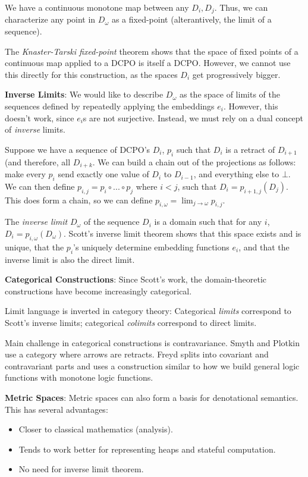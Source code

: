 \documentclass{article}
\begin{document}
We have a continuous monotone map between any $D_i, D_j$.  Thus, we
can characterize any point in $D_{\omega}$ as a fixed-point
(alterantively, the limit of a sequence).

The \emph{Knaster-Tarski fixed-point} theorem shows that the space of
fixed points of a continuous map applied to a DCPO is itself a DCPO.
However, we cannot use this directly for this construction, as the
spaces $D_i$ get progressively bigger.

\textbf{Inverse Limits}: We would like to describe $D_{\omega}$ as the
space of limits of the sequences defined by repeatedly applying the
embeddings $e_i$.  However, this doesn't work, since $e_i$s are not
surjective.  Instead, we must rely on a dual concept of \emph{inverse}
limits.

Suppose we have a sequence of DCPO's $D_i$, $p_i$ such that $D_i$ is a
retract of $D_{i+1}$ (and therefore, all $D_{i+k}$.  We can build a
chain out of the projections as follows: make every $p_i$ send exactly
one value of $D_i$ to $D_{i-1}$, and everything else to $\bot$.  We
can then define $p_{i,j} = p_i \circ ... \circ p_j$ where $i < j$,
such that $D_i = p_{i+1, j}(D_j)$.  This does form a chain, so we can
define $p_{i,\omega} = \lim_{j\rightarrow\omega}p_{i, j}$.

The \emph{inverse limit} $D_{\omega}$ of the sequence $D_i$ is a
domain such that for any $i$, $D_i = p_{i, \omega}(D_{\omega})$.
Scott's inverse limit theorem shows that this space exists and is
unique, that the $p_i$'s uniquely determine embedding functions $e_i$,
and that the inverse limit is also the direct limit.

\textbf{Categorical Constructions}: Since Scott's work, the
domain-theoretic constructions have become increasingly categorical.

Limit language is inverted in category theory: Categorical
\emph{limits} correspond to Scott's inverse limits; categorical
\emph{colimits} correspond to direct limits.

Main challenge in categorical constructions is contravariance.  Smyth
and Plotkin use a category where arrows are retracts.  Freyd splits
into covariant and contravariant parts and uses a construction similar
to how we build general logic functions with monotone logic functions.

\textbf{Metric Spaces}: Metric spaces can also form a basis for
denotational semantics.  This has several advantages:
\begin{itemize}
  \item Closer to classical mathematics (analysis).
  \item Tends to work better for representing heaps and stateful computation.
  \item No need for inverse limit theorem.
\end{itemize}
\end{document}
